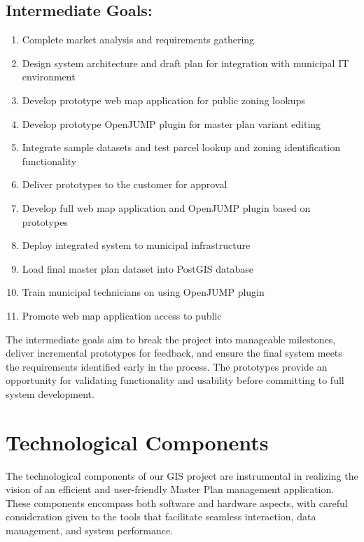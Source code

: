 \subsection{Intermediate Goals:}\label{subsec:intermediate-goals:}
\begin{enumerate}
    \item Complete market analysis and requirements gathering
    \item Design system architecture and draft plan for integration with municipal IT environment
    \item Develop prototype web map application for public zoning lookups
    \item Develop prototype OpenJUMP plugin for master plan variant editing
    \item Integrate sample datasets and test parcel lookup and zoning identification functionality
    \item Deliver prototypes to the customer for approval
    \item Develop full web map application and OpenJUMP plugin based on prototypes
    \item Deploy integrated system to municipal infrastructure
    \item Load final master plan dataset into PostGIS database
    \item Train municipal technicians on using OpenJUMP plugin
    \item Promote web map application access to public
\end{enumerate}


The intermediate goals aim to break the project into manageable milestones, deliver incremental prototypes for feedback, and ensure the final system meets the requirements identified early in the process. The prototypes provide an opportunity for validating functionality and usability before committing to full system development.


\section{Technological Components}\label{sec:technological-components}
The technological components of our GIS project are instrumental in realizing the vision of an efficient and user-friendly Master Plan management application. These components encompass both software and hardware aspects, with careful consideration given to the tools that facilitate seamless interaction, data management, and system performance.

